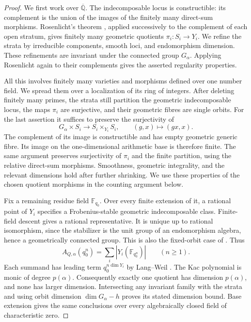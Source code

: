 \documentclass[11pt, reqno]{amsart}
\numberwithin{equation}{section}
\theoremstyle{definition}
\theoremstyle{remark}
\newcommand{\mb}[1]{\mathbb{#1}}
\begin{document}
\begin{proof}
We first work over $\overline{\mb Q}$. The indecomposable locus
is constructible: its complement is the union of the images of the
finitely many direct-sum morphisms. Rosenlicht's theorem
\cite{Rosenlicht}, applied successively to the complement of each open
stratum, gives finitely many geometric quotients $\pi_i:S_i\to Y_i$.
We refine the strata by irreducible components, smooth loci, and
endomorphism dimension. These refinements are invariant under the
connected group $G_\alpha$. Applying Rosenlicht again to their
complements gives the asserted regularity properties.

All this involves finitely many varieties and morphisms defined over
one number field. We spread them over a localization of its ring of
integers. After deleting finitely many primes, the strata still
partition the geometric indecomposable locus, the maps $\pi_i$ are
surjective, and their geometric fibres are single orbits. For the last
assertion it suffices to preserve the surjectivity of
\[ G_\alpha\times S_i\longrightarrow S_i\times_{Y_i}S_i,\qquad (g,x)\longmapsto(gx,x). \]
The complement of its image is constructible and has empty geometric
generic fibre. Its image on the one-dimensional arithmetic base is
therefore finite. The same argument preserves surjectivity of $\pi_i$
and the finite partition, using the relative direct-sum morphisms.
Smoothness, geometric integrality, and the relevant dimensions hold
after further shrinking. We use these properties of the chosen
quotient morphisms in the counting argument below.

Fix a remaining residue field $\mb F_{q_0}$. Over every finite
extension of it, a rational point of $Y_i$ specifies a Frobenius-stable
geometric indecomposable class. Finite-field descent gives a rational
representative. It is unique up to rational isomorphism, since the
stabilizer is the unit group of an endomorphism algebra, hence a
geometrically connected group. This is also the fixed-orbit case of
\cite[Lemma~3.1, Theorem~5.1, and Corollary~5.4]{DengDu}. Thus
\begin{equation}\label{eq:quotient-count-spread} A_{Q,\alpha}(q_0^n)=\sum_i |Y_i(\mb F_{q_0^n})|\qquad(n\ge1).\end{equation}
Each summand has leading term $q_0^{n\dim Y_i}$ by Lang--Weil
\cite{LangWeil}. The Kac polynomial is monic of degree $p(\alpha)$.
Consequently exactly one quotient has dimension $p(\alpha)$, and none
has larger dimension. Intersecting any invariant family with the
strata and using orbit dimension $\dim G_\alpha-h$ proves its stated
dimension bound. Base extension gives the same conclusions over every
algebraically closed field of characteristic zero.


\end{proof}
\end{document}
